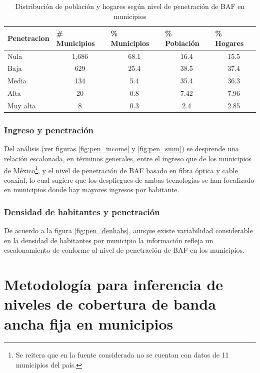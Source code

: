 \documentclass[9pt,twocolumn,twoside]{ilcss}
\begin{document}
\begin{table}[tbhp]
\centering
\caption{Distribución de población y hogares según nivel de penetración de BAF en municipios}
\label{tab:dist_pob_hogs}
\begin{tabular}{@{}lcccc@{}}
	\toprule
	Penetracion & \multicolumn{1}{l}{\# Municipios} & \multicolumn{1}{l}{\% Municipios} & \multicolumn{1}{l}{\% Población} & \multicolumn{1}{l}{\% Hogares} \\ \midrule
	Nula & 1,686 & 68.1 & 16.4 & 15.5 \\
	Baja & 629 & 25.4 & 38.5 & 37.4 \\
	Media & 134 & 5.4 & 35.4 & 36.3 \\
	Alta & 20 & 0.8 & 7.42 & 7.96 \\
	Muy alta & 8 & 0.3 & 2.4 & 2.85 \\ \bottomrule
\end{tabular}
\end{table}


\subsubsection{Ingreso y penetración}
Del análisis (ver figuras \ref{fig:pen_income} y \ref{fig:pen_smm}) se desprende una relación escalonada, en términos generales, entre el ingreso que de los municipios de México\footnote{Se reitera que en la fuente considerada no se cuentan con datos de 11 municipios del país.}, y el nivel de penetración de BAF basado en fibra óptica y cable coaxial, lo cual sugiere que los despliegues de ambas tecnologías se han focalizado en municipios donde hay mayores ingresos por habitante.



\subsubsection{Densidad de habitantes y penetración}

De acuerdo a la figura \ref{fig:pen_denhabs}, aunque existe variabilidad considerable en la densidad de habitantes por municipio la información refleja un escalonamiento de conforme al nivel de penetración de BAF en los municipios.

\section{Metodología para inferencia de niveles de cobertura de banda ancha fija en municipios}
\end{document}
